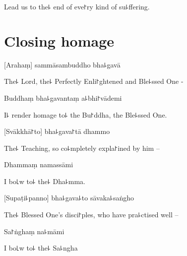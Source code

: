\begin{english}
  Lead us to the꜕ end of eve꜓ry kind of su꜕ffering.
\end{english}

\clearpage

\chapter{Closing homage}                            %

[Arahaṃ] sammāsambuddho bha꜕gavā

\begin{english}
  The꜕ Lord, the꜕ Perfectly Enli꜓ghtened and Ble꜕ssed One -
\end{english}

Buddhaṃ bha꜕gavantaṃ a꜕bhi꜓vādemi

\begin{english}
  I꜕ render homage to꜕ the Bu꜓ddha, the Ble꜕ssed One.
\end{english}

[Svākkhā꜓to] bha꜕gava꜓tā dhammo

\begin{english}
  The꜕ Teaching, so co꜕mpletely expla꜓ined by him --
\end{english}

Dhammaṃ namassāmi

\begin{english}
  I bo꜖w to꜕ the꜕ Dha꜕mma.
\end{english}


[Supaṭi꜕panno] bha꜕gava꜕to sāvaka꜕saṅgho

\begin{english}
  The꜕ Blessed One's disci꜓ples, who have pra꜕ctised well --
\end{english}

Sa꜓ṅghaṃ na꜕māmi

\begin{english}
  I bo꜖w to꜕ the꜕ Sa꜕ngha
\end{english}


